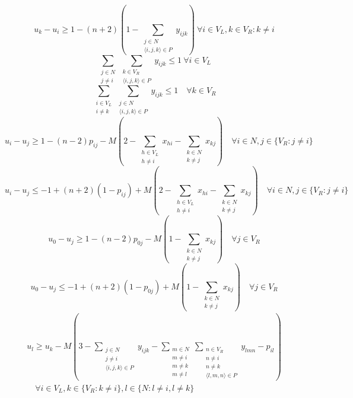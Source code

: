 \documentclass[a4paper,12pt]{report}
\begin{document}
\begin{center}
\begin{equation}
\end{equation}
\begin{equation}\label{eqn:9}
u_k-u_i \geq 1-(n+2)(1- \sum_{\substack{j \in N \\ 
\langle i,j,k \rangle  \in P}} y_{ijk}) \ \forall i \in V_L,k \in {V_R:k \neq i}
\end{equation}
\begin{equation}\label{eqn:10}
\sum_{\substack{j \in N \\ j \neq i}} \sum_{\substack{k \in V_R \\ \langle i,j,k \rangle \in P}} y_{ijk} \leq 1 \ \forall i \in V_L
\end{equation}
\begin{equation}\label{eqn:11}
\sum_{\substack{i \in V_L \\  i \neq k}} \sum_{\substack{j \in N \\ \langle i,j,k \rangle \in P}} y_{ijk} \leq 1 \quad \forall k \in V_R
\end{equation}
\begin{equation}\label{eqn:12}
u_i-u_j \geq 1-(n-2)p_{ij}-M(2-\sum_{\substack{h\in V_L \\ h \neq i}}x_{hi}-\sum_{\substack{k\in N \\ k \neq j}}x_{kj}) \quad \forall i \in N, j\in \{V_R:j \neq i\}
\end{equation}
\begin{equation}\label{eqn:13}
u_i-u_j \leq -1+(n+2)(1-p_{ij})+M(2-\sum_{\substack{h\in V_L \\ h \neq i}}x_{hi}-\sum_{\substack{k\in N \\ k \neq j}}x_{kj}) \quad \forall i \in N, j\in \{V_R:j \neq i\}
\end{equation}
\begin{equation}\label{eqn:14}
u_0-u_j \geq 1-(n-2)p_{0j}-M(1-\sum_{\substack{k\in N \\ k \neq j}}x_{kj}) \quad \forall j\in V_R
\end{equation}
\begin{equation}\label{eqn:15}
u_0-u_j \leq -1+(n+2)(1-p_{0j})+M(1-\sum_{\substack{k\in N \\ k \neq j}}x_{kj}) \quad \forall j\in V_R
\end{equation}
\begin{equation}\label{eqn:16}
\begin{array}{l}
u_l \geq u_k-M(3-\sum_{\substack{j \in N \\ j \neq i \\ \langle i,j,k \rangle \in P}}y_{ijk}-\sum_{\substack{m \in N \\ m \neq i \\ m \neq k \\ m \neq l}}\sum_{\substack{n \in V_R\\n \neq i \\ n \neq k \\ \langle l,m,n \rangle  \in P}}y_{lmn}-p_{il}) \\ \quad \forall i \in V_L,k \in \{V_R:k \neq i\},l \in \{N:l \neq i,l\neq k\}

\end{array}
\end{equation}
\end{center}
\end{document}
